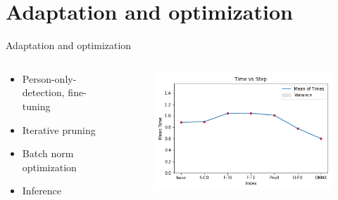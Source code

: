 \documentclass[en]{sdqbeamer}
\begin{document}
\section{Adaptation and optimization}
\begin{frame}{Adaptation and optimization}
  \begin{columns}
    \begin{column}{0.4\textwidth}
      \begin{itemize}
        \item Person-only-detection, fine-tuning
        \item Iterative pruning
        \item Batch norm optimization
        \item Inference
      \end{itemize}
    \end{column}
    \begin{column}{0.6\textwidth}
      \begin{figure}
        \includegraphics[scale=0.5]{time_against_step}
      \end{figure}
    \end{column}
  \end{columns}
\end{frame}
\end{document}
